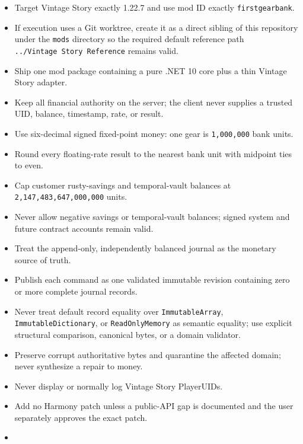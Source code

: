 \documentclass[
  10pt,
  letterpaper,
]{article}
\newcommand{\passthrough}[1]{#1}
\providecommand{\tightlist}{%
  \setlength{\itemsep}{0pt}\setlength{\parskip}{0pt}}
\begin{document}
\begin{itemize}
\tightlist
\item
  Target Vintage Story exactly 1.22.7 and use mod ID exactly
  \passthrough{\lstinline!firstgearbank!}.
\item
  If execution uses a Git worktree, create it as a direct sibling of
  this repository under the \passthrough{\lstinline!mods!} directory so
  the required default reference path
  \texttt{.}\allowbreak{}\texttt{.}\allowbreak{}\texttt{/}\allowbreak{}\texttt{Vintage\ }\allowbreak{}\texttt{Story\ }\allowbreak{}\texttt{Reference}
  remains valid.
\item
  Ship one mod package containing a pure .NET 10 core plus a thin
  Vintage Story adapter.
\item
  Keep all financial authority on the server; the client never supplies
  a trusted UID, balance, timestamp, rate, or result.
\item
  Use six-decimal signed fixed-point money: one gear is
  \passthrough{\lstinline!1,000,000!} bank units.
\item
  Round every floating-rate result to the nearest bank unit with
  midpoint ties to even.
\item
  Cap customer rusty-savings and temporal-vault balances at
  \passthrough{\lstinline!2,147,483,647,000,000!} units.
\item
  Never allow negative savings or temporal-vault balances; signed system
  and future contract accounts remain valid.
\item
  Treat the append-only, independently balanced journal as the monetary
  source of truth.
\item
  Publish each command as one validated immutable revision containing
  zero or more complete journal records.
\item
  Never treat default record equality over
  \passthrough{\lstinline!ImmutableArray!},
  \passthrough{\lstinline!ImmutableDictionary!}, or
  \passthrough{\lstinline!ReadOnlyMemory!} as semantic equality; use
  explicit structural comparison, canonical bytes, or a domain
  validator.
\item
  Preserve corrupt authoritative bytes and quarantine the affected
  domain; never synthesize a repair to money.
\item
  Never display or normally log Vintage Story PlayerUIDs.
\item
  Add no Harmony patch unless a public-API gap is documented and the
  user separately approves the exact patch.
\item

\end{itemize}
\end{document}
